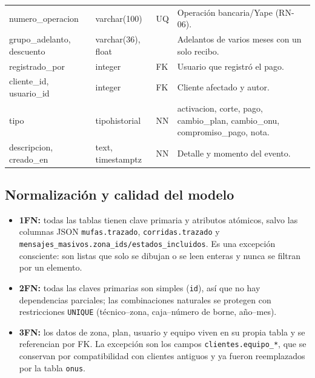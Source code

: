 {\begin{longtable}{L{3.4cm}L{2.5cm}L{1.4cm}L{6.4cm}}
numero\_operacion & varchar(100) & UQ & Operación bancaria/Yape (RN-06). \\
grupo\_adelanto, descuento & varchar(36), float & & Adelantos de varios meses con un solo recibo. \\
registrado\_por & integer & FK & Usuario que registró el pago. \\
cliente\_id, usuario\_id & integer & FK & Cliente afectado y autor. \\
tipo & tipohistorial & NN & activacion, corte, pago, cambio\_plan, cambio\_onu, compromiso\_pago, nota. \\
descripcion, creado\_en & text, timestamptz & NN & Detalle y momento del evento. \\
\end{longtable}
}

\subsection{Normalización y calidad del modelo}
\label{sec:ce02-normalizacion}

\begin{itemize}
  \item \textbf{1FN:} todas las tablas tienen clave primaria y atributos atómicos,
  salvo las columnas JSON \texttt{mufas.trazado}, \texttt{corridas.trazado} y
  \texttt{mensajes\_masivos.zona\_ids/estados\_incluidos}. Es una excepción
  consciente: son listas que solo se dibujan o se leen enteras y nunca se filtran
  por un elemento.
  \item \textbf{2FN:} todas las claves primarias son simples (\texttt{id}), así que no
  hay dependencias parciales; las combinaciones naturales se protegen con
  restricciones \texttt{UNIQUE} (técnico--zona, caja--número de borne, año--mes).
  \item \textbf{3FN:} los datos de zona, plan, usuario y equipo viven en su propia
  tabla y se referencian por FK. La excepción son los campos \texttt{clientes.equipo\_*},
  que se conservan por compatibilidad con clientes antiguos y ya fueron reemplazados
  por la tabla \texttt{onus}.
\end{itemize}

